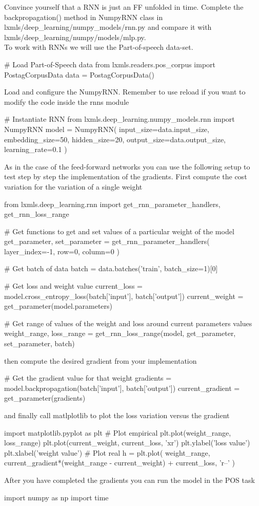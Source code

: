 \begin{exercise}
\label{exercise:rnnnumpy}
Convince yourself that a RNN is just an FF unfolded in time. Complete the 
backpropagation() method in NumpyRNN class in lxmls/deep\_learning/numpy\_models/rnn.py
and compare it with\\ lxmls/deep\_learning/numpy/models/mlp.py.\\

\noindent To work with RNNs we will use the Part-of-speech data-set.
\begin{python}
# Load Part-of-Speech data 
from lxmls.readers.pos_corpus import PostagCorpusData
data = PostagCorpusData() 
\end{python}
\clearpage
\noindent Load and configure the NumpyRNN. Remember to use reload if you want to modify 
the code inside the rnns module
\begin{python}
# Instantiate RNN
from lxmls.deep_learning.numpy_models.rnn import NumpyRNN
model = NumpyRNN(
    input_size=data.input_size,
    embedding_size=50,
    hidden_size=20,
    output_size=data.output_size,
    learning_rate=0.1
)
\end{python}
As in the case of the feed-forward networks you can use the following setup to
test step by step the implementation of the gradients. First compute the cost
variation for the variation of a single weight
\begin{python}
from lxmls.deep_learning.rnn import get_rnn_parameter_handlers, get_rnn_loss_range

# Get functions to get and set values of a particular weight of the model
get_parameter, set_parameter = get_rnn_parameter_handlers(
    layer_index=-1,
    row=0, 
    column=0
)

# Get batch of data
batch = data.batches('train', batch_size=1)[0]

# Get loss and weight value
current_loss = model.cross_entropy_loss(batch['input'], batch['output'])
current_weight = get_parameter(model.parameters)

# Get range of values of the weight and loss around current parameters values
weight_range, loss_range = get_rnn_loss_range(model, get_parameter, set_parameter, batch)
\end{python}
then compute the desired gradient from your implementation
\begin{python}
# Get the gradient value for that weight
gradients = model.backpropagation(batch['input'], batch['output'])
current_gradient = get_parameter(gradients)
\end{python}
and finally call matlplotlib to plot the loss variation versus the gradient
\begin{python}
import matplotlib.pyplot as plt
# Plot empirical
plt.plot(weight_range, loss_range)
plt.plot(current_weight, current_loss, 'xr')
plt.ylabel('loss value')
plt.xlabel('weight value')
# Plot real
h = plt.plot(
    weight_range,
    current_gradient*(weight_range - current_weight) + current_loss, 
    'r--'
)
\end{python}
\clearpage
\noindent After you have completed the gradients you can run the model in the POS task
\begin{python}
import numpy as np
import time


\end{python}
\end{exercise}
